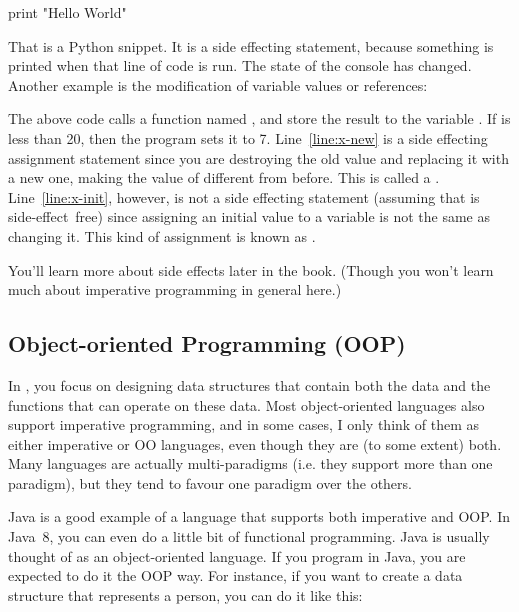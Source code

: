 \begin{Python}
print "Hello World"
\end{Python}

That is a Python snippet. It is a side effecting statement, because something is printed when that line of code is run. The state of the console has changed. Another example is the modification of variable values or references: 

\begin{Python}
x = function_that_returns_int() (*@\label{line:x-init}@*)
if x < 20:
	x = 7 (*@{\label{line:x-new}@*)
\end{Python}

The above code calls a function named , and store the result to the variable . If  is less than 20, then the program sets it to 7. Line~\ref{line:x-new} is a side effecting assignment statement since you are destroying the old value and replacing it with a new one, making the value of  different from before. This is called a . Line~\ref{line:x-init}, however, is not a side effecting statement (assuming that  is side-effect~free) since assigning an initial value to a variable is not the same as changing it. This kind of assignment is known as .

You'll learn more about side effects later in the book. (Though you won't learn much about imperative programming in general here.)

\subsection{Object-oriented Programming (OOP)}
In , you focus on designing data structures that contain both the data and the functions that can operate on these data. Most object-oriented languages also support imperative programming, and in some cases, I only think of them as either imperative  or OO languages, even though they are (to some extent) both. Many languages are actually multi-paradigms (i.e. they support more than one paradigm), but they tend to favour one paradigm over the others. 

Java is a good example of a language that supports both imperative and OOP. In Java~8, you can even do a little bit of functional programming. Java is usually thought of as an object-oriented language. If you program in Java, you are expected to do it the OOP way. For instance, if you want to create a data structure that represents a person, you can do it like this:

